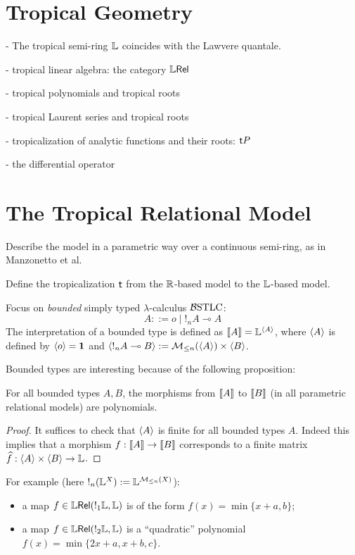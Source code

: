 \documentclass[conference]{IEEEtran}
\begin{document}
\section{Tropical Geometry}

- The tropical semi-ring $\mathbb{L}$ coincides with the Lawvere quantale.


- tropical linear algebra: the category $\mathbb{L}\mathsf{Rel}$


- tropical polynomials and tropical roots


- tropical Laurent series and tropical roots


- tropicalization of analytic functions and their roots: 
$\mathsf{t} P$ 



- the differential operator 



\section{The Tropical Relational Model}


Describe the model in a parametric way over a continuous semi-ring, as in Manzonetto et al.





Define the tropicalization $\trop$ from the $\mathbb{R}$-based model
to the $\mathbb{L}$-based model.

Focus on \emph{bounded} simply typed $\lambda$-calculus $\mathcal{B}\mathrm{STLC}$:
$$
A::= o \mid !_{n}A \multimap A
$$
The interpretation of a bounded type is defined as 
$\llbracket A\rrbracket= \mathbb{L}^{\langle A\rangle}$, where 
$\langle A\rangle$ is defined by $\langle o\rangle=\mathbf{1}$ and 
$\langle !_{n}A\multimap B\rangle:= \mathcal{M}_{\leq n}(\langle A\rangle) \times \langle B\rangle$.

Bounded types are interesting
because of the following proposition:
\begin{proposition}
For all bounded types $A,B$, the morphisms from $\llbracket A\rrbracket$ to $\llbracket B\rrbracket$ (in all parametric relational models) are polynomials.


\end{proposition}
\begin{proof}
It suffices to check that $\langle A\rangle$ is finite for all bounded types $A$. Indeed this implies that a morphism $f:\llbracket A\rrbracket\to \llbracket B\rrbracket$ corresponds to a finite matrix $\widehat f: \langle A\rangle \times \langle B\rangle \to \mathbb{L}$.
\end{proof}

For example (here $!_{n}(\mathbb{L}^{X}):= \mathbb{L}^{\mathcal{M}_{\leq n}(X)}$):
\begin{itemize}
\item a map $f\in \mathbb{L}\mathsf{Rel}( !_{1}\mathbb{L}, \mathbb{L})$ is of the form $f(x)=\min \{x+a,b\}$;

\item a map $f\in \mathbb{L}\mathsf{Rel}(!_{2}\mathbb{L}, \mathbb{L})$ is a ``quadratic'' polynomial $f(x)=\min\{2x+a, x+b, c\}$.



\end{itemize}
\end{document}
